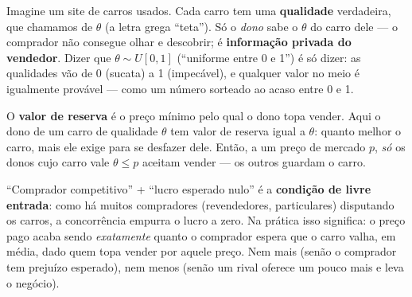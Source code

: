 \documentclass[11pt,a4paper]{article}
\begin{document}
\begin{empalavras}
Imagine um site de carros usados. Cada carro tem uma \textbf{qualidade} verdadeira,
que chamamos de $\theta$ (a letra grega ``teta''). Só o \emph{dono} sabe o $\theta$ do
carro dele — o comprador não consegue olhar e descobrir; é \textbf{informação privada do
vendedor}. Dizer que $\theta \sim U[0,1]$ (``uniforme entre 0 e 1'') é só dizer: as
qualidades vão de 0 (sucata) a 1 (impecável), e qualquer valor no meio é igualmente
provável — como um número sorteado ao acaso entre 0 e 1.

\smallskip\noindent
O \textbf{valor de reserva} é o preço mínimo pelo qual o dono topa vender. Aqui o dono de
um carro de qualidade $\theta$ tem valor de reserva igual a $\theta$: quanto melhor o
carro, mais ele exige para se desfazer dele. Então, a um preço de mercado $p$, \emph{só}
os donos cujo carro vale $\theta \le p$ aceitam vender — os outros guardam o carro.

\smallskip\noindent
``Comprador competitivo'' + ``lucro esperado nulo'' é a \textbf{condição de livre entrada}:
como há muitos compradores (revendedores, particulares) disputando os carros, a concorrência
empurra o lucro a zero. Na prática isso significa: o preço pago acaba sendo \emph{exatamente}
quanto o comprador espera que o carro valha, em média, dado quem topa vender por aquele preço.
Nem mais (senão o comprador tem prejuízo esperado), nem menos (senão um rival oferece um
pouco mais e leva o negócio).
\end{empalavras}
\end{document}
